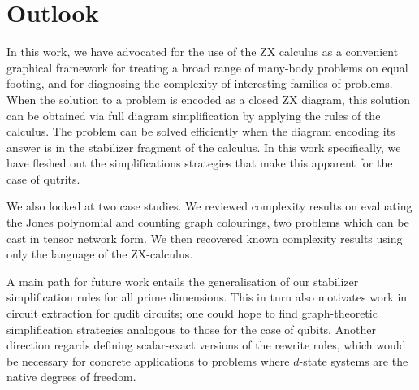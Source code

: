 \section{Outlook}

In this work, we have advocated for the use of the ZX calculus
as a convenient graphical framework for treating a broad range of many-body problems on equal footing, and for diagnosing the complexity of interesting families of problems.
When the solution to a problem is encoded as a closed ZX diagram,
this solution can be obtained via full diagram simplification by applying the rules of the calculus.
The problem can be solved efficiently when the diagram encoding its answer is in the stabilizer fragment of the calculus.
In this work specifically, we have fleshed out the simplifications strategies that make this apparent for the case of qutrits.

We also looked at two case studies.
We reviewed complexity results on evaluating the Jones polynomial and counting graph colourings, two problems which can be cast in tensor network form.
We then recovered known complexity results using only the language of the ZX-calculus.

A main path for future work entails the generalisation
of our stabilizer simplification rules for all prime dimensions.
This in turn also motivates work in circuit extraction \cite{backens2020again} for qudit circuits; one could hope to find graph-theoretic simplification \cite{graph_theoretic_simplification} strategies analogous to those for the case of qubits.
Another direction regards defining scalar-exact versions of the rewrite rules, which would be necessary for concrete applications to problems where $d$-state systems are the native degrees of freedom.
